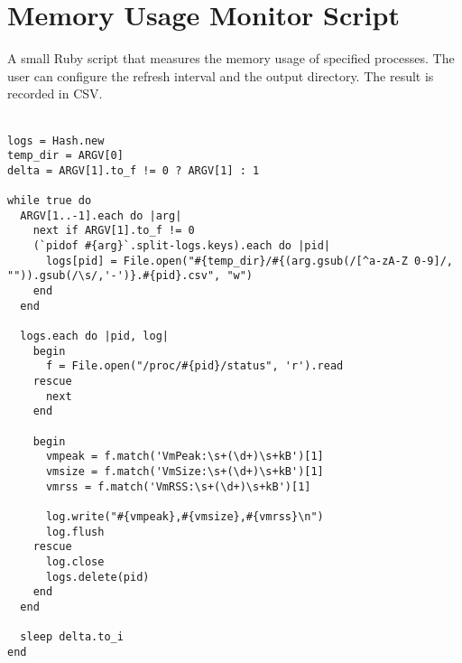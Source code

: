 \chapter{Memory Usage Monitor Script} %
\label{ap:monitor}

A small Ruby script that measures the memory usage of specified processes. The user can configure the refresh interval and the output directory. The result is recorded in CSV.\\\\

\begin{lstlisting}
logs = Hash.new
temp_dir = ARGV[0]
delta = ARGV[1].to_f != 0 ? ARGV[1] : 1

while true do
  ARGV[1..-1].each do |arg|
    next if ARGV[1].to_f != 0
    (`pidof #{arg}`.split-logs.keys).each do |pid|
      logs[pid] = File.open("#{temp_dir}/#{(arg.gsub(/[^a-zA-Z 0-9]/, "")).gsub(/\s/,'-')}.#{pid}.csv", "w")
    end
  end

  logs.each do |pid, log|
    begin
      f = File.open("/proc/#{pid}/status", 'r').read
    rescue
      next
    end
    
    begin
      vmpeak = f.match('VmPeak:\s+(\d+)\s+kB')[1]
      vmsize = f.match('VmSize:\s+(\d+)\s+kB')[1]
      vmrss = f.match('VmRSS:\s+(\d+)\s+kB')[1]

      log.write("#{vmpeak},#{vmsize},#{vmrss}\n")
      log.flush
    rescue
      log.close
      logs.delete(pid)
    end
  end
  
  sleep delta.to_i
end
\end{lstlisting}
